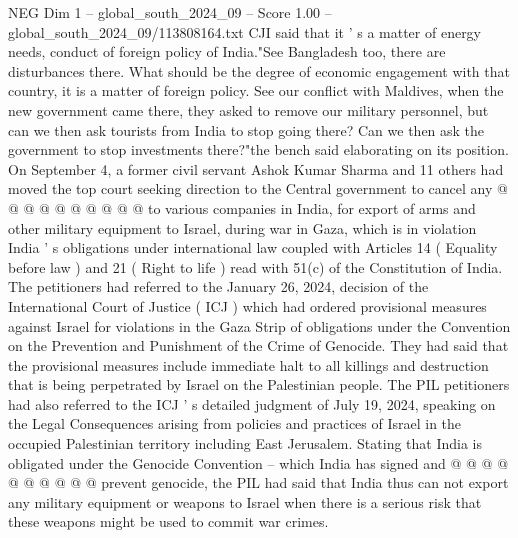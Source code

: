 \begin{textsample}{NEG Dim 1 – global\_south\_2024\_09 – Score 1.00 – global\_south\_2024\_09/113808164.txt}
CJI said that it ' s a matter of energy needs, conduct of foreign policy of India."See Bangladesh too, there are disturbances there.
What should be the degree of economic engagement with that country, it is a matter of foreign policy.
See our conflict with Maldives, when the new government came there, they asked to remove our military personnel, but can we then ask tourists from India to stop going there?
Can we then ask the government to stop investments there?"the bench said elaborating on its position.
On September 4, a former civil servant Ashok Kumar Sharma and 11 others had moved the top court seeking direction to the Central government to cancel any @ @ @ @ @ @ @ @ @ @ to various companies in India, for export of arms and other military equipment to Israel, during war in Gaza, which is in violation India ' s obligations under international law coupled with Articles 14 ( Equality before law ) and 21 ( Right to life ) read with 51(c) of the Constitution of India.
The petitioners had referred to the January 26, 2024, decision of the International Court of Justice ( ICJ ) which had ordered provisional measures against Israel for violations in the Gaza Strip of obligations under the Convention on the Prevention and Punishment of the Crime of Genocide.
They had said that the provisional measures include immediate halt to all killings and destruction that is being perpetrated by Israel on the Palestinian people.
The PIL petitioners had also referred to the ICJ ' s detailed judgment of July 19, 2024, speaking on the Legal Consequences arising from policies and practices of Israel in the occupied Palestinian territory including East Jerusalem.
Stating that India is obligated under the Genocide Convention -- which India has signed and @ @ @ @ @ @ @ @ @ @ prevent genocide, the PIL had said that India thus can not export any military equipment or weapons to Israel when there is a serious risk that these weapons might be used to commit war crimes.

\end{textsample}
